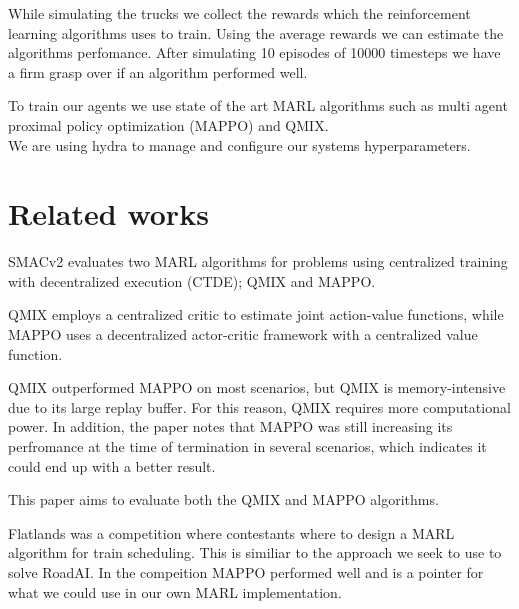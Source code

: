 \documentclass[conference]{IEEEtran}
\begin{document}
While simulating the trucks we collect the rewards which the reinforcement learning algorithms uses to train.
Using the average rewards we can estimate the algorithms perfomance. After simulating 10 episodes of 10000 timesteps we have a firm grasp over if an algorithm performed well.

To train our agents we use state of the art MARL algorithms such as multi agent proximal policy  optimization (MAPPO) and QMIX.
\\
We are using hydra\cite{Yadan2019Hydra} to manage and configure our systems hyperparameters.


\section{Related works}
SMACv2\cite{ellis2022smacv2} evaluates two MARL algorithms for problems using centralized training with
decentralized execution (CTDE); QMIX and MAPPO.

QMIX employs a centralized critic to estimate joint action-value functions, while MAPPO uses a decentralized
actor-critic framework with a centralized value function.

QMIX outperformed MAPPO on most scenarios, but QMIX is memory-intensive due to its large replay buffer. For
this reason, QMIX requires more computational power. In addition, the paper notes that MAPPO was still
increasing its perfromance at the time of termination in several scenarios, which indicates it could end up
with a better result.

This paper aims to evaluate both the QMIX and MAPPO algorithms.


Flatlands\cite{laurent2021flatland} was a competition where contestants where to design a MARL algorithm for 
train scheduling. This is similiar to the approach we seek to use to solve RoadAI. 
In the compeition MAPPO performed well and is a pointer for what we could use in our own MARL implementation.

\noindent




\newpage


\end{document}
